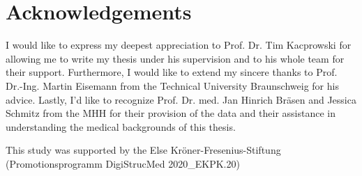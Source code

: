 \documentclass[12pt,a4paper,twoside,]{report}
\begin{document}
\clearpage

\section*{Acknowledgements}

\noindent

I would like to express my deepest appreciation to Prof. Dr. Tim Kacprowski for allowing me to write my thesis under his supervision and to his whole team for their support. Furthermore, I would like to extend my sincere thanks to Prof. Dr.-Ing. Martin Eisemann from the Technical University Braunschweig for his advice. Lastly, I’d like to recognize Prof. Dr. med. Jan Hinrich Bräsen and Jessica Schmitz from the MHH for their provision of the data and their assistance in understanding the medical backgrounds of this thesis.

This study was supported by the Else Kröner-Fresenius-Stiftung (Promotionsprogramm DigiStrucMed 2020\_EKPK.20)
\noindent


\clearpage


\tableofcontents


\cleardoublepage


\renewcommand{\baselinestretch}{1.3}
\small\normalsize

\listoffigures

\renewcommand{\baselinestretch}{1}
\small\normalsize

\cleardoublepage


\renewcommand{\baselinestretch}{1.3}
\small\normalsize

\listoftables
\end{document}
